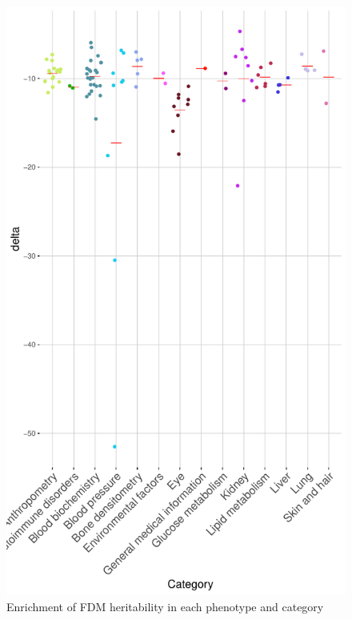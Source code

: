\begin{figure}[htb]
    \centering
    \includegraphics[width=\textwidth]{chapter4/figures/deltaplot.pdf}
    \caption{Enrichment of FDM heritability in each phenotype and category}
    \label{fig:4.2}
\end{figure}
